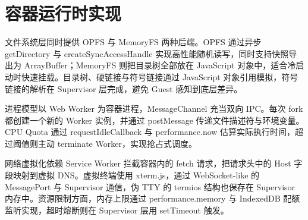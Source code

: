 \chapter{容器运行时实现}
文件系统层同时提供 OPFS 与 MemoryFS 两种后端。OPFS 通过异步 getDirectory 与 createSyncAccessHandle 实现高性能随机读写，同时支持快照导出为 ArrayBuffer；MemoryFS 则把目录树全部放在 JavaScript 对象中，适合冷启动时快速挂载。目录树、硬链接与符号链接通过 JavaScript 对象引用模拟，符号链接的解析在 Supervisor 层完成，避免 Guest 感知到底层差异。\par
进程模型以 Web Worker 为容器进程，MessageChannel 充当双向 IPC。每次 fork 都创建一个新的 Worker 实例，并通过 postMessage 传递文件描述符与环境变量。CPU Quota 通过 requestIdleCallback 与 performance.now 估算实际执行时间，超过阈值则主动 terminate Worker，实现抢占式调度。\par
网络虚拟化依赖 Service Worker 拦截容器内的 fetch 请求，把请求头中的 Host 字段映射到虚拟 DNS。虚拟终端使用 xterm.js，通过 WebSocket-like 的 MessagePort 与 Supervisor 通信，伪 TTY 的 termios 结构也保存在 Supervisor 内存中。资源限制方面，内存上限通过 performance.memory 与 IndexedDB 配额监听实现，超时熔断则在 Supervisor 层用 setTimeout 触发。\par
